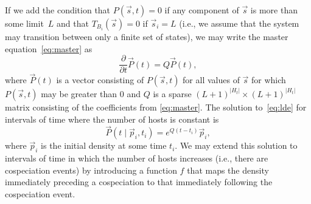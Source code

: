 \documentclass{article}
\begin{document}
            If we add the condition that $P\left(\vec{s},t\right) = 0$ if any
            component of $\vec{s}$ is more than some limit~$L$ and that
            $T_{B_i}\left(\vec{s}\right) = 0$ if $\vec{s}_i = L$ (i.e., we
            assume that the system may transition between only a finite set of
            states), we may write the master equation~\eqref{eq:master} as
            \begin{equation}
                \label{eq:lde}
                \frac{\partial}{\partial t} \vec{P}\left(t\right) =
                Q\vec{P}\left(t\right),
            \end{equation}
            where $\vec{P}\left(t\right)$ is a vector consisting of
            $P\left(\vec{s}, t\right)$ for all values of $\vec{s}$ for which
            $P\left(\vec{s}, t\right)$ may be greater than 0 and $Q$ is a
            sparse $(L+1)^{\lvert{H_t}\rvert} \times (L+1)^{\lvert{H_t}\rvert}$
            matrix consisting of the coefficients from \eqref{eq:master}. The
            solution to~\eqref{eq:lde} for intervals of time where the number
            of hosts is constant is
            \begin{equation}
                \vec{P}\left(t\mid\vec{p}_i, t_i\right) =
                e^{Q\left(t-t_i\right)}\vec{p}_i,
            \end{equation}
            where $\vec{p}_i$ is the initial density at some time $t_i$. We may
            extend this solution to intervals of time in which the number of
            hosts increases (i.e., there are cospeciation events) by
            introducing a function $f$ that maps the density immediately
            preceding a cospeciation to that immediately following the
            cospeciation event.
\end{document}
